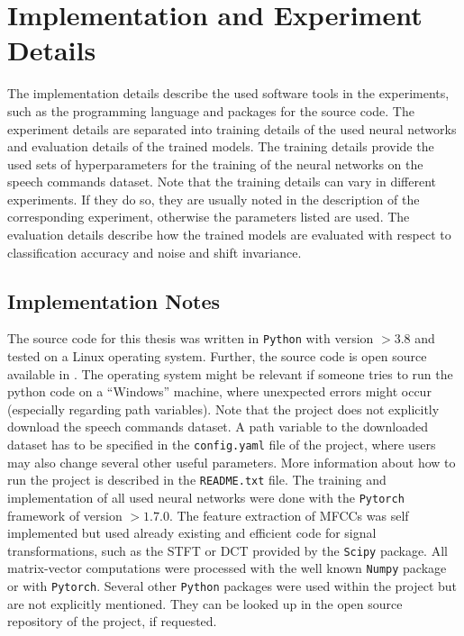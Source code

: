 
\section{Implementation and Experiment Details}\label{sec:exp_details}
The implementation details describe the used software tools in the experiments, such as the programming language and packages for the source code.
The experiment details are separated into training details of the used neural networks and evaluation details of the trained models.
The training details provide the used sets of hyperparameters for the training of the neural networks on the speech commands dataset.
Note that the training details can vary in different experiments.
If they do so, they are usually noted in the description of the corresponding experiment, otherwise the parameters listed are used.
The evaluation details describe how the trained models are evaluated with respect to classification accuracy and noise and shift invariance.



\subsection{Implementation Notes}\label{sec:exp_details_implementation}
The source code for this thesis was written in \texttt{Python} with version $>3.8$ and tested on a Linux operating system.
Further, the source code is open source available in \cite{KWSGame}.
The operating system might be relevant if someone tries to run the python code on a \enquote{Windows} machine, where unexpected errors might occur (especially regarding path variables).
Note that the project does not explicitly download the speech commands dataset.
A path variable to the downloaded dataset has to be specified in the \texttt{config.yaml} file of the project, where users may also change several other useful parameters.
More information about how to run the project is described in the \texttt{README.txt} file.
The training and implementation of all used neural networks were done with the \texttt{Pytorch} \cite{Paszke2019Pytorch} framework of version $>1.7.0$. 
The feature extraction of MFCCs was self implemented but used already existing and efficient code for signal transformations, such as the STFT or DCT provided by the \texttt{Scipy} package.
All matrix-vector computations were processed with the well known \texttt{Numpy} package or with \texttt{Pytorch}.
Several other \texttt{Python} packages were used within the project but are not explicitly mentioned.
They can be looked up in the open source repository of the project, if requested.


